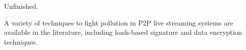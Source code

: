 
\label{sec:CIS}

\begin{note}
  Unfinished.
\end{note}

A variety of techniques to fight pollution in P2P live streaming
systems are available in the literature, including hash-based
signature and data encryption techniques.

